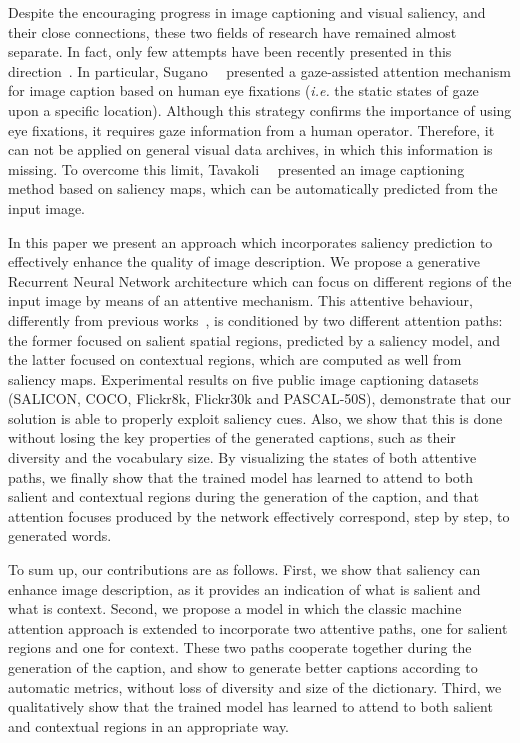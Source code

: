 Despite the encouraging progress in image captioning and visual saliency, and their close connections, these two fields of research have remained almost separate. In fact, only few attempts have been recently presented in this direction~\cite{sugano2016seeing,tavakoli2017can}.
In particular, Sugano~\etal~\cite{sugano2016seeing} presented a gaze-assisted attention mechanism for image caption based on human eye fixations (\textit{i.e.} the static states of gaze upon a specific location). Although this strategy confirms the importance of using eye fixations, it requires gaze information from a human operator. Therefore, it can not be applied on general visual data archives, in which this information is missing. 
To overcome this limit, Tavakoli~\etal~\cite{tavakoli2017can} presented an image captioning method based on saliency maps, which can be automatically predicted from the input image.

In this paper we present an approach which incorporates saliency prediction to effectively enhance the quality of image description. We propose a generative Recurrent Neural Network architecture which can focus on different regions of the input image by means of an attentive mechanism. This attentive behaviour, differently from previous works~\cite{icml2015xuc15}, is conditioned by two different attention paths: the former focused on salient spatial regions, predicted by a saliency model, and the latter focused on contextual regions, which are computed as well from saliency maps. Experimental results on five public image captioning datasets (SALICON, COCO, Flickr8k, Flickr30k and PASCAL-50S), demonstrate that our solution is able to properly exploit saliency cues. Also, we show that this is done without losing the key properties of the generated captions, such as their diversity and the vocabulary size. By visualizing the states of both attentive paths, we finally show that the trained model has learned to attend to both salient and contextual regions during the generation of the caption, and that attention focuses produced by the network effectively correspond, step by step, to generated words.

To sum up, our contributions are as follows. First, we show that saliency can enhance image description, as it provides an indication of what is salient and what is context. Second, we propose a model in which the classic machine attention approach is extended to incorporate two attentive paths, one for salient regions and one for context. These two paths cooperate together during the generation of the caption, and show to generate better captions according to automatic metrics, without loss of diversity and size of the dictionary. Third, we qualitatively show that the trained model has learned to attend to both salient and contextual regions in an appropriate way.

